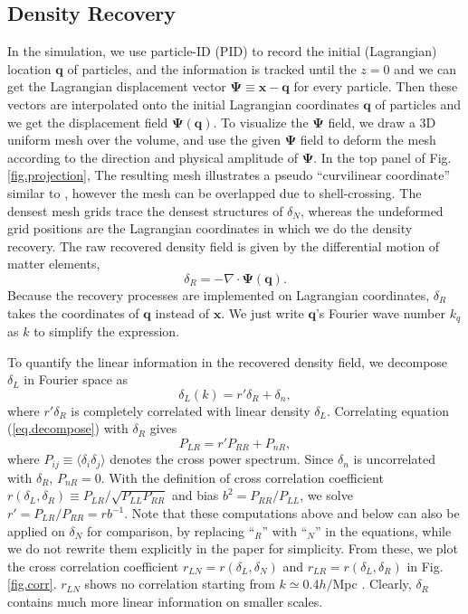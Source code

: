 \documentclass[aps,prd,twocolumn,superscriptaddress,amsfont,amssymb,amsmath,nofootinbib,showpacs,balancelastpage]{revtex4-1}
\newcommand{\bs}{\boldsymbol}
\begin{document}
\subsection{Density Recovery}\label{ss.reco}
In the simulation, we use particle-ID (PID) to record the initial (Lagrangian) location ${\bs 
q}$ of particles, and the information is tracked until the $z=0$ and we can get the 
Lagrangian displacement vector ${\bs \Psi}\equiv{\bs x}-{\bs q}$ for every 
particle. Then these vectors are interpolated onto the initial Lagrangian 
coordinates ${\bs q}$ of particles and we get the displacement field ${\bs \Psi}
({\bs q})$.
To visualize the $\bs\Psi$ field, we draw a 3D uniform mesh over the volume,
and use the given $\bs\Psi$ field to deform the mesh according to the direction
and physical amplitude of $\bs\Psi$. In the top panel of Fig.\ref{fig.projection},
The resulting mesh illustrates a pseudo
``curvilinear coordinate'' similar to \cite{1995ApJS..100..269P},
however the mesh can be overlapped due to shell-crossing. The densest mesh grids
trace the densest structures of $\delta_N$, whereas the undeformed grid positions
are the Lagrangian coordinates in which we do the density recovery.
The raw recovered density field is given by the differential motion of matter 
elements,
\begin{equation}
    \delta_R=-\nabla\cdot{\bs \Psi}({\bs q}).
\end{equation}
Because the recovery processes are implemented on Lagrangian coordinates,
$\delta_R$ takes the coordinates of $\bs q$ instead of $\bs x$.
We just write $\bs q$'s Fourier wave number
$k_q$ as $k$ to simplify the expression.

To quantify the linear information in the recovered density field, we decompose $\delta_L$ in Fourier space as
\begin{equation}\label{eq.decompose}
    \delta_L(k)=r'\delta_R+\delta_n,
\end{equation}
where $r'\delta_R$ is completely correlated with linear density $\delta_L$. Correlating equation (\ref{eq.decompose}) with $\delta_R$ gives
\begin{equation}
    P_{LR}=r'P_{RR}+P_{nR},
\end{equation}
where $P_{ij}\equiv\langle\delta_i\delta_j\rangle$ denotes the cross power 
spectrum. Since $\delta_n$ is uncorrelated with $\delta_R$, $P_{nR}=0$. With the 
definition of cross correlation coefficient $r(\delta_L,\delta_R)\equiv P_{LR}/\sqrt{P_{LL}P_{RR}}$ 
and bias $b^2=P_{RR}/P_{LL}$, we solve $r'=P_{LR}/P_{RR}=rb^{-1}$.
Note that these computations above and below can also be applied on $\delta_N$ for
comparison, by replacing ``$_R$'' with ``$_N$'' in the equations,
while we do not rewrite them explicitly
in the paper for simplicity. From these, we plot the cross 
correlation coefficient $r_{LN}=r(\delta_L,\delta_N)$ and
$r_{LR}=r(\delta_L,\delta_R)$ in Fig.\ref{fig.corr}.
$r_{LN}$ shows no correlation starting from $k\simeq 0.4 h/$Mpc \citep{2004MNRAS.355..129S}.
Clearly, $
\delta_R$ contains much more linear information on smaller scales.
\end{document}
